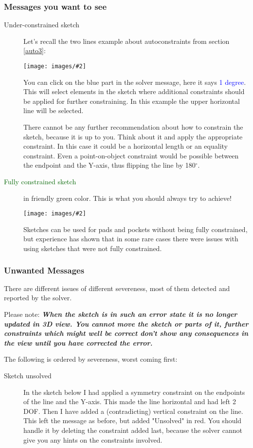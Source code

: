 \documentclass[12pt,titlepage]{article}
\newcommand{\degree}{\ensuremath{^\circ}}
\newcommand{\img}[2]{\vspace{2ex}\noindent\texttt{[image: images/\#2]}}
\begin{document}
\begin {itemize}
\subsubsection{Messages you want to see}
\begin{description}
\item [Under-constrained sketch] Let's recall the two lines example about
      autoconstraints from section \vref{auto3}:

\img{}{ConstraintsSolverUnder}

You can click on the blue part in the solver message, here it says \textcolor{blue}{1
degree}. This will select elements in the sketch where additional constraints should be
applied for further constraining. In this example the upper horizontal
line will be selected.

There cannot be any further recommendation about how to constrain the sketch, because
it is up to you. Think about it and apply the appropriate constraint. In this case it
could be a horizontal length or an equality constraint. Even a point-on-object
constraint would be possible between the endpoint and the Y-axis, thus flipping the
line by 180\degree.
\item [\textcolor{darkGreen}{Fully constrained sketch}] in friendly green color. This is
      what you should always try to achieve!

\img{}{ConstraintsSolverFull}
      
      Sketches can be used for pads and pockets without being fully constrained, but
      experience has shown that in some rare cases there were issues with
      using sketches that were not fully constrained.
\end{description}

\subsubsection{Unwanted Messages}
There are different issues of different severeness, most of them detected and
reported by the solver.

Please note: {\bf\em When the sketch is in such an error state it is no longer updated
in 3D view. You cannot move the sketch or parts of it, further constraints which
might well be correct don't show any consequences in the view until you have
corrected the error.}

The following is ordered by severeness, worst coming first:
\begin{description}
\item [Sketch unsolved] In the sketch below I had applied a symmetry constraint on
      the endpoints of the line and the Y-axis. This made the line horizontal and had left 2 DOF. Then I have added
      a (contradicting) vertical constraint on the line. This left the message as
      before, but added "Unsolved" in red. You should handle it by deleting the
      constraint added last, because the solver cannot give you any hints on the
      constraints involved.


\end{description}
\end{itemize}
\end{document}
